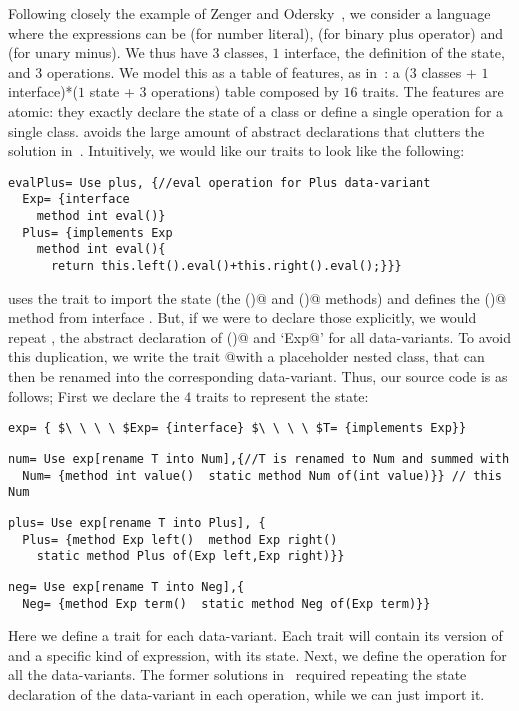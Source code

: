 Following closely
the example of Zenger and Odersky~\cite{Zenger-Odersky2005},
we consider a language where the
expressions \Q@Exp@ can
be \Q@Num@ (for number literal),
\Q@Plus@ (for binary plus operator)
and \Q@Neg@ (for unary minus).
We thus have $3$ classes, $1$ interface,
the definition of the state, and $3$ operations.
We model this
as a table of features, as in~\cite{deep}:
a ($3$ classes + $1$ interface)*($1$ state + $3$ operations)
table composed by $16$ traits.
The features are atomic: they exactly 
declare the state of a class
or define a single operation for a single class.
\name avoids the large amount of abstract declarations
that clutters the solution in~\cite{deep}.
Intuitively, we would like our traits to look like the following:
\begin{lstlisting}
evalPlus= Use plus, {//eval operation for Plus data-variant
  Exp= {interface
    method int eval()}
  Plus= {implements Exp
    method int eval(){
      return this.left().eval()+this.right().eval();}}}
\end{lstlisting}
\Q@evalPlus@ uses the trait \Q@plus@ to import the state (the \Q@left()@ and \Q@right()@ methods)
and defines the \Q@eval()@ method from interface \Q@Exp@.
But, if we were to declare those
explicitly, we would repeat \Q@Exp@, the abstract
declaration of \Q@eval()@ and `\Q@implements Exp@'
for all data-variants.
To avoid this duplication,  we write 
the trait \Q@eval @with a placeholder \Q@T@ nested class, that can then be renamed
into the corresponding data-variant.
Thus, our source code is as follows;
First we declare the $4$ traits to represent the state:
\newcommand\multiCode{\vspace{-5pt}}
\saveSpace
\begin{lstlisting}
exp= { $\ \ \ \ $Exp= {interface} $\ \ \ \ $T= {implements Exp}}
\end{lstlisting}
\multiCode
\begin{lstlisting}
num= Use exp[rename T into Num],{//T is renamed to Num and summed with
  Num= {method int value()  static method Num of(int value)}} // this Num
\end{lstlisting}
\multiCode
\begin{lstlisting}
plus= Use exp[rename T into Plus], {
  Plus= {method Exp left()  method Exp right()
    static method Plus of(Exp left,Exp right)}}
\end{lstlisting}
\multiCode
\begin{lstlisting}
neg= Use exp[rename T into Neg],{
  Neg= {method Exp term()  static method Neg of(Exp term)}}
\end{lstlisting}
Here we define a trait for each data-variant.
Each trait will contain its version of \Q@Exp@
and a specific kind of expression, with its state.
Next, we define the operation \Q@eval@ for all the data-variants.
The former solutions in~\cite{deep}
required repeating the state declaration of the 
data-variant in each operation, while we can just import it.

